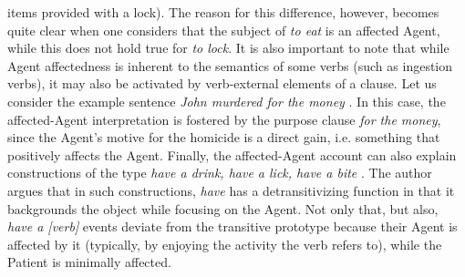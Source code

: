 items provided with a lock). The reason for this difference, however, becomes quite clear when one considers that the subject of \textit{to eat} is an affected Agent, while this does not hold true for \textit{to lock}. It is also important to note that while Agent affectedness is inherent to the semantics of some verbs (such as ingestion verbs), it may also be activated by verb-external elements of a clause. Let us consider the example sentence \textit{John murdered for the money} \parencite[136]{Naess2007}. In this case, the affected-Agent interpretation is fostered by the purpose clause \textit{for the money}, since the Agent's motive for the homicide is a direct gain, i.e. something that positively affects the Agent. Finally, the affected-Agent account can also explain constructions of the type \textit{have a drink, have a lick, have a bite} \parencite[758, 771]{Wierzbicka1982}. The author argues that in such constructions, \textit{have} has a detransitivizing function in that it backgrounds the object while focusing on the Agent. Not only that, but also, \textit{have a [verb]} events deviate from the transitive prototype because their Agent is affected by it (typically, by enjoying the activity the verb refers to), while the Patient is minimally affected.\\
